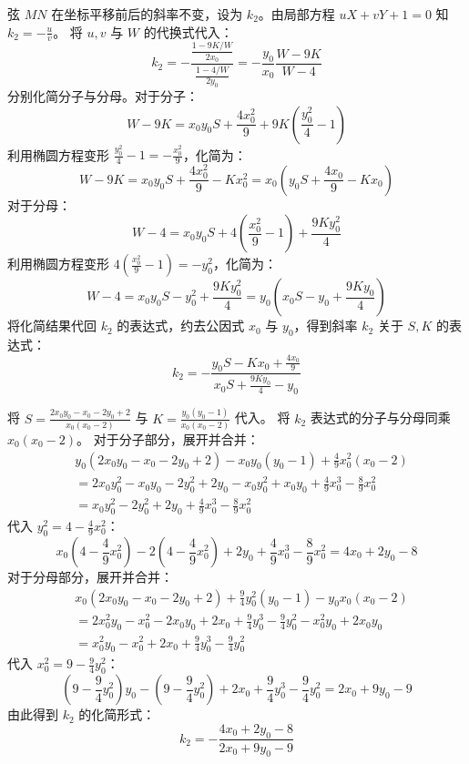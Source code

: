 \begin{solution}
弦 $MN$ 在坐标平移前后的斜率不变，设为 $k_2$。由局部方程 $uX + vY + 1 = 0$ 知 $k_2 = -\frac{u}{v}$。
将 $u, v$ 与 $W$ 的代换式代入：
$$ k_2 = -\frac{\frac{1 - 9K/W}{2x_0}}{\frac{1 - 4/W}{2y_0}} = -\frac{y_0}{x_0} \frac{W - 9K}{W - 4} $$
分别化简分子与分母。对于分子：
$$ W - 9K = x_0 y_0 S + \frac{4x_0^2}{9} + 9K\left(\frac{y_0^2}{4} - 1\right) $$
利用椭圆方程变形 $\frac{y_0^2}{4} - 1 = -\frac{x_0^2}{9}$，化简为：
$$ W - 9K = x_0 y_0 S + \frac{4x_0^2}{9} - K x_0^2 = x_0\left(y_0 S + \frac{4x_0}{9} - K x_0\right) $$
对于分母：
$$ W - 4 = x_0 y_0 S + 4\left(\frac{x_0^2}{9} - 1\right) + \frac{9K y_0^2}{4} $$
利用椭圆方程变形 $4\left(\frac{x_0^2}{9} - 1\right) = -y_0^2$，化简为：
$$ W - 4 = x_0 y_0 S - y_0^2 + \frac{9K y_0^2}{4} = y_0\left(x_0 S - y_0 + \frac{9K y_0}{4}\right) $$
将化简结果代回 $k_2$ 的表达式，约去公因式 $x_0$ 与 $y_0$，得到斜率 $k_2$ 关于 $S, K$ 的表达式：
$$ k_2 = -\frac{y_0 S - K x_0 + \frac{4x_0}{9}}{x_0 S + \frac{9K y_0}{4} - y_0} $$

将 $S = \frac{2x_0 y_0 - x_0 - 2y_0 + 2}{x_0(x_0 - 2)}$ 与 $K = \frac{y_0(y_0 - 1)}{x_0(x_0 - 2)}$ 代入。
将 $k_2$ 表达式的分子与分母同乘 $x_0(x_0 - 2)$。
对于分子部分，展开并合并：
\begin{align*}
& y_0(2x_0 y_0 - x_0 - 2y_0 + 2) - x_0 y_0(y_0 - 1) + \frac{4}{9}x_0^2(x_0 - 2) \\
&= 2x_0 y_0^2 - x_0 y_0 - 2y_0^2 + 2y_0 - x_0 y_0^2 + x_0 y_0 + \frac{4}{9}x_0^3 - \frac{8}{9}x_0^2 \\
&= x_0 y_0^2 - 2y_0^2 + 2y_0 + \frac{4}{9}x_0^3 - \frac{8}{9}x_0^2
\end{align*}
代入 $y_0^2 = 4 - \frac{4}{9}x_0^2$：
$$ x_0\left(4 - \frac{4}{9}x_0^2\right) - 2\left(4 - \frac{4}{9}x_0^2\right) + 2y_0 + \frac{4}{9}x_0^3 - \frac{8}{9}x_0^2 = 4x_0 + 2y_0 - 8 $$
对于分母部分，展开并合并：
\begin{align*}
& x_0(2x_0 y_0 - x_0 - 2y_0 + 2) + \frac{9}{4}y_0^2(y_0 - 1) - y_0 x_0(x_0 - 2) \\
&= 2x_0^2 y_0 - x_0^2 - 2x_0 y_0 + 2x_0 + \frac{9}{4}y_0^3 - \frac{9}{4}y_0^2 - x_0^2 y_0 + 2x_0 y_0 \\
&= x_0^2 y_0 - x_0^2 + 2x_0 + \frac{9}{4}y_0^3 - \frac{9}{4}y_0^2
\end{align*}
代入 $x_0^2 = 9 - \frac{9}{4}y_0^2$：
$$ \left(9 - \frac{9}{4}y_0^2\right)y_0 - \left(9 - \frac{9}{4}y_0^2\right) + 2x_0 + \frac{9}{4}y_0^3 - \frac{9}{4}y_0^2 = 2x_0 + 9y_0 - 9 $$
由此得到 $k_2$ 的化简形式：
$$ k_2 = -\frac{4x_0 + 2y_0 - 8}{2x_0 + 9y_0 - 9} $$


\end{solution}
